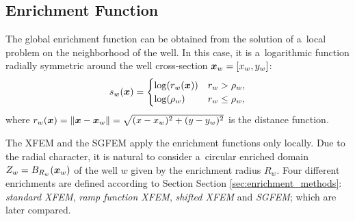 \subsection{Enrichment Function}
\label{sec:enrichment_func}
 The global enrichment function can be obtained from the solution of a~local problem on the neighborhood of the well.
 In this case, it is a~logarithmic function radially symmetric around the well cross-section $\mathbf{\boldsymbol{x}}_w=[x_w, y_w]$:
\begin{equation} \label{eqn:enrich_func}
s_w(\mathbf{\boldsymbol{x}}) = 
  \begin{cases}
  \log(r_w(\mathbf{\boldsymbol{x}})) & r_w > \rho_w,\\
  \log(\rho_w) & r_w \le \rho_w,\\
  \end{cases}
\end{equation}
where $r_w(\mathbf{\boldsymbol{x}}) = \|\mathbf{\boldsymbol{x}} - \mathbf{\boldsymbol{x}}_w\|= \sqrt{(x-x_w)^2+(y-y_w)^2}$ is the distance function.

The XFEM and the SGFEM apply the enrichment functions only locally. 
Due to the radial character, it is natural to consider a~circular enriched domain $Z_w = B_{R_w}(\mathbf{\boldsymbol{x}}_w)$
of the well $w$ given by the enrichment radius $R_w$.
Four different enrichments are defined according to Section Section \ref{sec:enrichment_methods}:
\emph{standard XFEM}, \emph{ramp function XFEM}, \emph{shifted XFEM} and \emph{SGFEM}; which are later compared.




